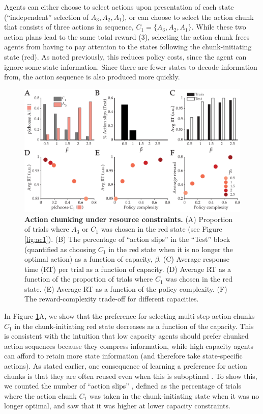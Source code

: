 \documentclass[11pt]{article}
\begin{document}
Agents can either choose to select actions upon presentation of each state (``independent'' selection of $A_3,A_2,A_1$), or can choose to select the action chunk that consists of three actions in sequence, $C_1 = \{A_3,A_2,A_1\}$. While these two action plans lead to the same total reward (3), selecting the action chunk frees agents from having to pay attention to the states following the chunk-initiating state (red). As noted previously, this reduces policy costs, since the agent can ignore some state information. Since there are fewer states to decode information from, the action sequence is also produced more quickly.

\begin{figure}
    \centering
    \includegraphics[width=\textwidth]{figs/ac2.pdf}
    \caption{\textbf{Action chunking under resource constraints.} (A) Proportion of trials where $A_3$ or $C_1$ was chosen in the red state (see Figure \ref{fig:ac1}). (B) The percentage of ``action slips'' in the ``Test'' block (quantified as choosing $C_1$ in the red state when it is no longer the optimal action) as a function of capacity, $\beta$. (C) Average response time (RT) per trial as a function of capacity. (D) Average RT as a function of the proportion of trials where $C_1$ was chosen in the red state. (E) Average RT as a function of the policy complexity. (F) The reward-complexity trade-off for different capacities.}
    \label{fig:ac2}
\end{figure}

In Figure \ref{fig:ac2}A, we show that the preference for selecting multi-step action chunks $C_1$ in the chunk-initiating red state decreases as a function of the capacity. This is consistent with the intuition that low capacity agents should prefer chunked action sequences because they compress information, while high capacity agents can afford to retain more state information (and therefore take state-specific actions). As stated earlier, one consequence of learning a preference for action chunks is that they are often reused even when this is suboptimal \citep{Huys2015-cq}. To show this, we counted the number of  ``action slips'' \citep[cf.][]{norman81}, defined as the percentage of trials where the action chunk $C_1$ was taken in the chunk-initiating state when it was no longer optimal, and saw that it was higher at lower capacity constraints. 
\end{document}

